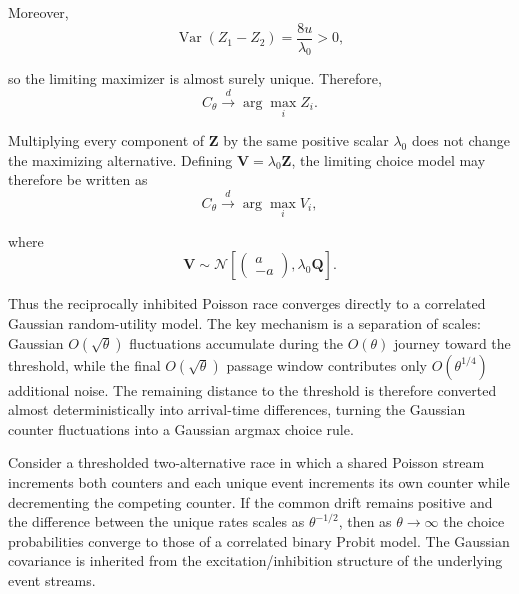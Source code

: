 \documentclass[
  man,
  floatsintext,
  longtable,
  a4paper,
  nolmodern,
  notxfonts,
  notimes,
  colorlinks=true,linkcolor=blue,citecolor=blue,urlcolor=blue]{apa7}
\begin{document}
Moreover, \[
\operatorname{Var}(Z_1-Z_2)
=
\frac{8u}{\lambda_0}
>0,
\]

so the limiting maximizer is almost surely unique. Therefore, \[
C_\theta
\xrightarrow{d}
\arg\max_i Z_i.
\]

Multiplying every component of \(\mathbf Z\) by the same positive scalar
\(\lambda_0\) does not change the maximizing alternative. Defining
\(\mathbf V=\lambda_0\mathbf Z\), the limiting choice model may
therefore be written as \[
C_\theta
\xrightarrow{d}
\arg\max_i V_i,
\]

where \[
\mathbf V
\sim
\mathcal N
\left[
\begin{pmatrix}
a\\
-a
\end{pmatrix},
\lambda_0\mathbf Q
\right].
\]

Thus the reciprocally inhibited Poisson race converges directly to a
correlated Gaussian random-utility model. The key mechanism is a
separation of scales: Gaussian \(O(\sqrt{\theta})\) fluctuations
accumulate during the \(O(\theta)\) journey toward the threshold, while
the final \(O(\sqrt{\theta})\) passage window contributes only
\(O(\theta^{1/4})\) additional noise. The remaining distance to the
threshold is therefore converted almost deterministically into
arrival-time differences, turning the Gaussian counter fluctuations into
a Gaussian argmax choice rule.

\begin{tcolorbox}[enhanced jigsaw, colframe=quarto-callout-note-color-frame, leftrule=.75mm, colbacktitle=quarto-callout-note-color!10!white, titlerule=0mm, bottomrule=.15mm, opacityback=0, rightrule=.15mm, toptitle=1mm, bottomtitle=1mm, breakable, title={Result 4 (Correlated Probit Limit Under Reciprocal Inhibition)}, arc=.35mm, coltitle=black, opacitybacktitle=0.6, left=2mm, toprule=.15mm, colback=white]

Consider a thresholded two-alternative race in which a shared Poisson
stream increments both counters and each unique event increments its own
counter while decrementing the competing counter. If the common drift
remains positive and the difference between the unique rates scales as
\(\theta^{-1/2}\), then as \(\theta\to\infty\) the choice probabilities
converge to those of a correlated binary Probit model. The Gaussian
covariance is inherited from the excitation/inhibition structure of the
underlying event streams.

\end{tcolorbox}
\end{document}
